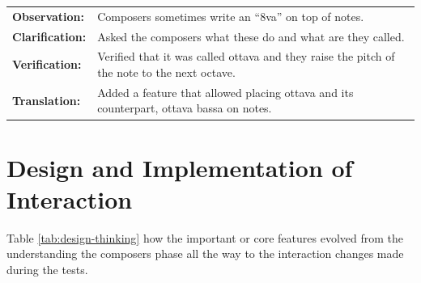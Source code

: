 \begin{longtable}{|p{2.5cm} p{12.5cm}|}
		  	\textbf{Observation:} 	& Composers sometimes write an ``8va'' on top of notes. \\
		  	\textbf{Clarification:} 	& Asked the composers what these do and what are they called. \\
		  	\textbf{Verification:} 	& Verified that it was called ottava and they raise the pitch of the note to the next octave. \\
		  	\textbf{Translation:} 	& Added a feature that allowed placing ottava and its counterpart, ottava bassa on notes. \\
		  	\hline
		\end{longtable}

	\section{Design and Implementation of Interaction}
	\label{sec:design}

		Table \ref{tab:design-thinking} how the important or core features evolved from the understanding the composers phase all the way to the interaction changes made during the tests. 

